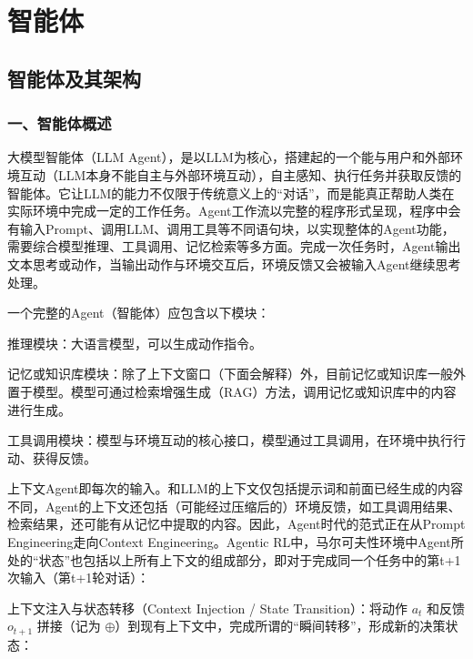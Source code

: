 \hypertarget{ux667aux80fdux4f53}{%
\chapter{智能体}\label{ux667aux80fdux4f53}}

\hypertarget{ux667aux80fdux4f53ux53caux5176ux67b6ux6784}{%
\section{智能体及其架构}\label{ux667aux80fdux4f53ux53caux5176ux67b6ux6784}}

\hypertarget{ux4e00ux667aux80fdux4f53ux6982ux8ff0}{%
\subsection{一、智能体概述}\label{ux4e00ux667aux80fdux4f53ux6982ux8ff0}}

大模型智能体（LLM Agent），是以LLM为核心，搭建起的一个能与用户和外部环境互动（LLM本身不能自主与外部环境互动），自主感知、执行任务并获取反馈的智能体。它让LLM的能力不仅限于传统意义上的``对话''，而是能真正帮助人类在实际环境中完成一定的工作任务。Agent工作流以完整的程序形式呈现，程序中会有输入Prompt、调用LLM、调用工具等不同语句块，以实现整体的Agent功能，需要综合模型推理、工具调用、记忆检索等多方面。完成一次任务时，Agent输出文本思考或动作，当输出动作与环境交互后，环境反馈又会被输入Agent继续思考处理。

一个完整的Agent（智能体）应包含以下模块：

推理模块：大语言模型，可以生成动作指令。

记忆或知识库模块：除了上下文窗口（下面会解释）外，目前记忆或知识库一般外置于模型。模型可通过检索增强生成（RAG）方法，调用记忆或知识库中的内容进行生成。

工具调用模块：模型与环境互动的核心接口，模型通过工具调用，在环境中执行行动、获得反馈。

上下文Agent即每次的输入。和LLM的上下文仅包括提示词和前面已经生成的内容不同，Agent的上下文还包括（可能经过压缩后的）环境反馈，如工具调用结果、检索结果，还可能有从记忆中提取的内容。因此，Agent时代的范式正在从Prompt Engineering走向Context Engineering。Agentic RL中，马尔可夫性环境中Agent所处的``状态''也包括以上所有上下文的组成部分，即对于完成同一个任务中的第t+1次输入（第t+1轮对话）：

上下文注入与状态转移（Context Injection / State Transition）：将动作 \(a_t\) 和反馈 \(o_{t+1}\) 拼接（记为 \(\oplus\)）到现有上下文中，完成所谓的``瞬间转移''，形成新的决策状态：

